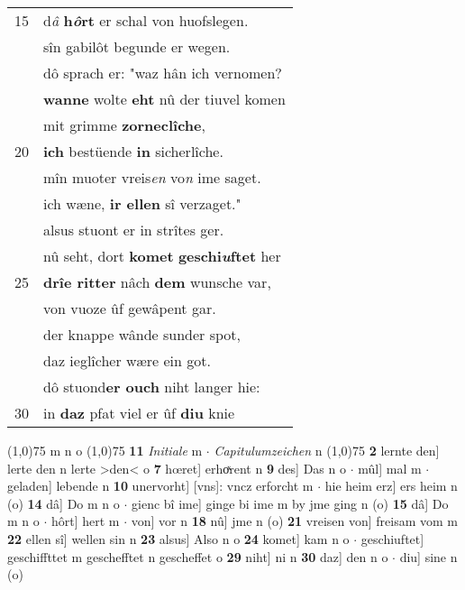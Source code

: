 \documentclass[8pt,a4paper,notitlepage]{article}
\begin{document}
\begin{table}[ht]
\begin{minipage}[t]{0.5\linewidth}
\begin{tabular}{rl}
15 & d\textit{â} \textbf{h\textit{ô}rt} er schal von huofslegen.\\ 
 & sîn gabilôt begunde er wegen.\\ 
 & dô sprach er: "waz hân ich vernomen?\\ 
 & \textbf{wanne} wolte \textbf{eht} nû der tiuvel komen\\ 
 & mit grimme \textbf{zorneclîche},\\ 
20 & \textbf{ich} bestüende \textbf{in} sicherlîche.\\ 
 & mîn muoter vreis\textit{en} vo\textit{n} ime saget.\\ 
 & ich wæne, \textbf{ir ellen} sî verzaget."\\ 
 & alsus stuont er in strîtes ger.\\ 
 & nû seht, dort \textbf{komet} \textbf{geschi\textit{u}ftet} her\\ 
25 & \textbf{drîe ritter} nâch \textbf{dem} wunsche var,\\ 
 & von vuoze ûf gewâpent gar.\\ 
 & der knappe wânde sunder spot,\\ 
 & daz ieglîcher wære ein got.\\ 
 & dô stuond\textbf{er ouch} niht langer hie:\\ 
30 & in \textbf{daz} pfat viel er ûf \textbf{diu} knie\\ 
\end{tabular}
\scriptsize
\line(1,0){75} \newline
m n o \newline
\line(1,0){75} \newline
\textbf{11} \textit{Initiale} m   $\cdot$ \textit{Capitulumzeichen} n  \newline
\line(1,0){75} \newline
\textbf{2} lernte den] lerte den n lerte >den< o \textbf{7} hœret] erhoͯrent n \textbf{9} des] Das n o  $\cdot$ mûl] mal m  $\cdot$ geladen] lebende n \textbf{10} unervorht] [vns]: vncz erforcht m  $\cdot$ hie heim erz] ers heim n (o) \textbf{14} dâ] Do m n o  $\cdot$ gienc bî ime] ginge bi ime m by jme ging n (o) \textbf{15} dâ] Do m n o  $\cdot$ hôrt] hert m  $\cdot$ von] vor n \textbf{18} nû] jme n (o) \textbf{21} vreisen von] freisam vom m \textbf{22} ellen sî] wellen sin n \textbf{23} alsus] Also n o \textbf{24} komet] kam n o  $\cdot$ geschiuftet] geschiffttet m geschefftet n gescheffet o \textbf{29} niht] ni n \textbf{30} daz] den n o  $\cdot$ diu] sine n (o) \newline
\end{minipage}
\end{table}
\end{document}
